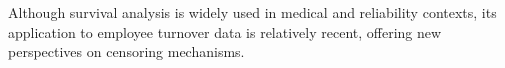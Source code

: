 

Although survival analysis is widely used in medical and reliability contexts, its application to employee turnover data is relatively recent, offering new perspectives on censoring mechanisms.
